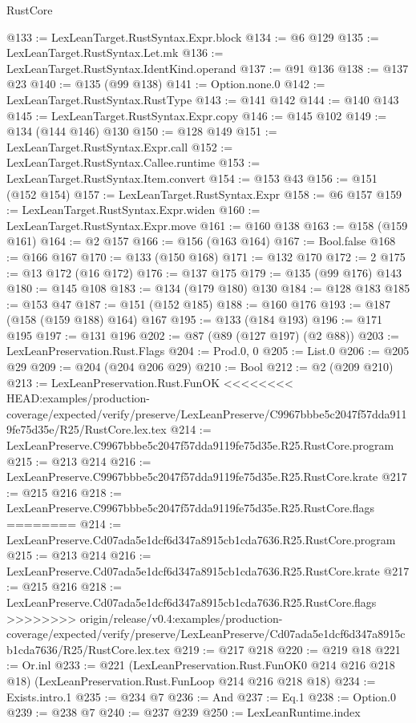 \begin{lexlean}{RustCore}
\begin{coremodule}
{\begin{coremodule}
{{{{{@133 := LexLeanTarget.RustSyntax.Expr.block
@134 := @6 @129
@135 := LexLeanTarget.RustSyntax.Let.mk
@136 := LexLeanTarget.RustSyntax.IdentKind.operand
@137 := @91 @136
@138 := @137 @23
@140 := @135 (@99 @138)
@141 := Option.none.{0}
@142 := LexLeanTarget.RustSyntax.RustType
@143 := @141 @142
@144 := @140 @143
@145 := LexLeanTarget.RustSyntax.Expr.copy
@146 := @145 @102
@149 := @134 (@144 @146) @130
@150 := @128 @149
@151 := LexLeanTarget.RustSyntax.Expr.call
@152 := LexLeanTarget.RustSyntax.Callee.runtime
@153 := LexLeanTarget.RustSyntax.Item.convert
@154 := @153 @43
@156 := @151 (@152 @154)
@157 := LexLeanTarget.RustSyntax.Expr
@158 := @6 @157
@159 := LexLeanTarget.RustSyntax.Expr.widen
@160 := LexLeanTarget.RustSyntax.Expr.move
@161 := @160 @138
@163 := @158 (@159 @161)
@164 := @2 @157
@166 := @156 (@163 @164)
@167 := Bool.false
@168 := @166 @167
@170 := @133 (@150 @168)
@171 := @132 @170
@172 := 2
@175 := @13 @172 (@16 @172)
@176 := @137 @175
@179 := @135 (@99 @176) @143
@180 := @145 @108
@183 := @134 (@179 @180) @130
@184 := @128 @183
@185 := @153 @47
@187 := @151 (@152 @185)
@188 := @160 @176
@193 := @187 (@158 (@159 @188) @164) @167
@195 := @133 (@184 @193)
@196 := @171 @195
@197 := @131 @196
@202 := @87 (@89 (@127 @197) (@2 @88))
@203 := LexLeanPreservation.Rust.Flags
@204 := Prod.{0, 0}
@205 := List.{0}
@206 := @205 @29
@209 := @204 (@204 @206 @29)
@210 := Bool
@212 := @2 (@209 @210)
@213 := LexLeanPreservation.Rust.FunOK
<<<<<<<< HEAD:examples/production-coverage/expected/verify/preserve/LexLeanPreserve/C9967bbbe5c2047f57dda9119fe75d35e/R25/RustCore.lex.tex
@214 := LexLeanPreserve.C9967bbbe5c2047f57dda9119fe75d35e.R25.RustCore.program
@215 := @213 @214
@216 := LexLeanPreserve.C9967bbbe5c2047f57dda9119fe75d35e.R25.RustCore.krate
@217 := @215 @216
@218 := LexLeanPreserve.C9967bbbe5c2047f57dda9119fe75d35e.R25.RustCore.flags
========
@214 := LexLeanPreserve.Cd07ada5e1dcf6d347a8915cb1cda7636.R25.RustCore.program
@215 := @213 @214
@216 := LexLeanPreserve.Cd07ada5e1dcf6d347a8915cb1cda7636.R25.RustCore.krate
@217 := @215 @216
@218 := LexLeanPreserve.Cd07ada5e1dcf6d347a8915cb1cda7636.R25.RustCore.flags
>>>>>>>> origin/release/v0.4:examples/production-coverage/expected/verify/preserve/LexLeanPreserve/Cd07ada5e1dcf6d347a8915cb1cda7636/R25/RustCore.lex.tex
@219 := @217 @218
@220 := @219 @18
@221 := Or.inl
@233 := @221
    (LexLeanPreservation.Rust.FunOK0 @214 @216 @218 @18)
    (LexLeanPreservation.Rust.FunLoop @214 @216 @218 @18)
@234 := Exists.intro.{1}
@235 := @234 @7
@236 := And
@237 := Eq.{1}
@238 := Option.{0}
@239 := @238 @7
@240 := @237 @239
@250 := LexLeanRuntime.index
}}}}}
\end{coremodule}}
\end{coremodule}
\end{lexlean}
